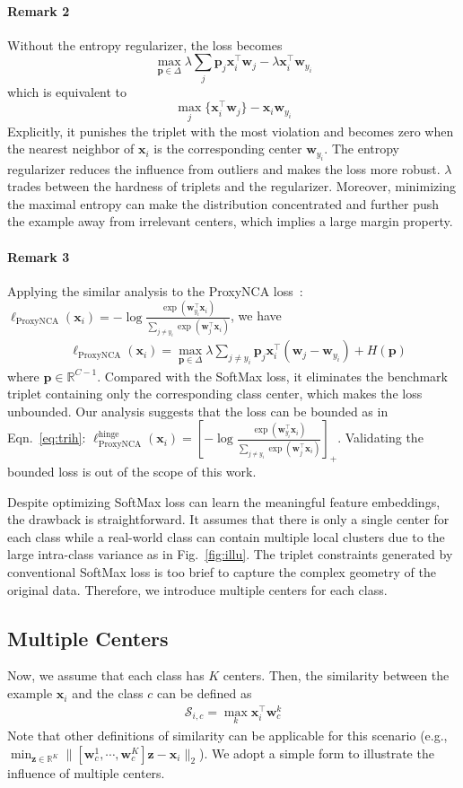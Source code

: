 \documentclass[10pt,twocolumn,letterpaper]{article}
\def \R {\mathbb{R}}
\def \x {\mathbf{x}}
\def \z {\mathbf{z}}
\def \p {\mathbf{p}}
\def \w {\mathbf{w}}
\begin{document}
\paragraph{Remark 2} Without the entropy regularizer, the loss becomes
\[\max_{\p\in\Delta} \lambda\sum_j \p_j \x_i^\top\w_j -\lambda \x_i^\top\w_{y_i}\]
which is equivalent to
\[\max_j \{\x_i^\top\w_j\} - \x_i\w_{y_i}\]
Explicitly, it punishes the triplet with the most violation and becomes zero when the nearest neighbor of $\x_i$ is the corresponding center $\w_{y_i}$. The entropy regularizer reduces the influence from outliers and makes the loss more robust. $\lambda$ trades between the hardness of triplets and the regularizer. Moreover, minimizing the maximal entropy can make the distribution concentrated and further push the example away from irrelevant centers, which implies a large margin property.

\paragraph{Remark 3} Applying the similar analysis to the ProxyNCA loss~\cite{Attias17}: $\ell_{\mathrm{ProxyNCA}}(\x_i) = -\log\frac{\exp(\w_{y_i}^\top \x_i)}{\sum_{j\not =y_i} \exp(\w_j^\top \x_i)}$, we have
\begin{align*}
&\ell_{\mathrm{ProxyNCA}}(\x_i)  = \max_{\p\in\Delta} \lambda \sum_{j\not= y_i} \p_j \x_i^\top (\w_j  - \w_{y_i})+ H(\p)
\end{align*}
where $\p\in\R^{C-1}$. Compared with the SoftMax loss, it eliminates the benchmark triplet containing only the corresponding class center, which makes the loss unbounded. Our analysis suggests that the loss can be bounded as in Eqn.~\ref{eq:trih}: 
$\ell_{\mathrm{ProxyNCA}}^{\mathrm{hinge}}(\x_i) = [-\log\frac{\exp(\w_{y_i}^\top \x_i)}{\sum_{j\not =y_i} \exp(\w_j^\top \x_i)}]_+$. Validating the bounded loss is out of the scope of this work.

Despite optimizing SoftMax loss can learn the meaningful feature embeddings, the drawback is straightforward. It assumes that there is only a single center for each class while a real-world class can contain multiple local clusters due to the large intra-class variance as in Fig.~\ref{fig:illu}. The triplet constraints generated by conventional SoftMax loss is too brief to capture the complex geometry of the original data. Therefore, we introduce multiple centers for each class.

\subsection{Multiple Centers}
Now, we assume that each class has $K$ centers. Then, the similarity between the example $\x_i$ and the class $c$ can be defined as
\begin{eqnarray}\label{eq:simh}
\mathcal{S}_{i,c} = \max_k \x_i^\top \w_c^k
\end{eqnarray}
Note that other definitions of similarity can be applicable for this scenario (e.g., $\min_{\z\in \R^K} \|[\w_c^1,\cdots,\w_c^K] \z - \x_i\|_2$). We adopt a simple form to illustrate the influence of multiple centers.
\end{document}
